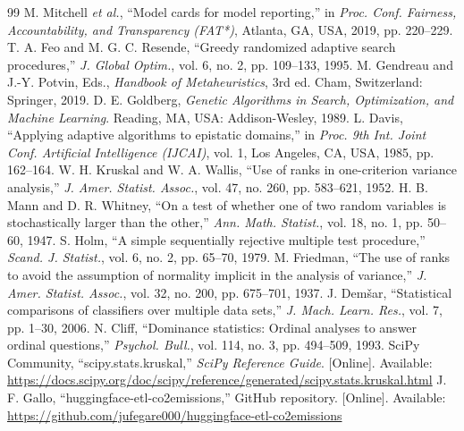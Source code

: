 \documentclass[conference]{IEEEtran}
\begin{document}
	\begin{thebibliography}{99}
		 M. Mitchell \emph{et al.}, ``Model cards for model reporting,'' in \emph{Proc. Conf. Fairness, Accountability, and Transparency (FAT*)}, Atlanta, GA, USA, 2019, pp. 220--229.
		 T. A. Feo and M. G. C. Resende, ``Greedy randomized adaptive search procedures,'' \emph{J. Global Optim.}, vol. 6, no. 2, pp. 109--133, 1995.
		 M. Gendreau and J.-Y. Potvin, Eds., \emph{Handbook of Metaheuristics}, 3rd ed. Cham, Switzerland: Springer, 2019.
		 D. E. Goldberg, \emph{Genetic Algorithms in Search, Optimization, and Machine Learning}. Reading, MA, USA: Addison-Wesley, 1989.
		 L. Davis, ``Applying adaptive algorithms to epistatic domains,'' in \emph{Proc. 9th Int. Joint Conf. Artificial Intelligence (IJCAI)}, vol. 1, Los Angeles, CA, USA, 1985, pp. 162--164.
		 W. H. Kruskal and W. A. Wallis, ``Use of ranks in one-criterion variance analysis,'' \emph{J. Amer. Statist. Assoc.}, vol. 47, no. 260, pp. 583--621, 1952.
		 H. B. Mann and D. R. Whitney, ``On a test of whether one of two random variables is stochastically larger than the other,'' \emph{Ann. Math. Statist.}, vol. 18, no. 1, pp. 50--60, 1947.
		 S. Holm, ``A simple sequentially rejective multiple test procedure,'' \emph{Scand. J. Statist.}, vol. 6, no. 2, pp. 65--70, 1979.
		 M. Friedman, ``The use of ranks to avoid the assumption of normality implicit in the analysis of variance,'' \emph{J. Amer. Statist. Assoc.}, vol. 32, no. 200, pp. 675--701, 1937.
		 J. Dem\v{s}ar, ``Statistical comparisons of classifiers over multiple data sets,'' \emph{J. Mach. Learn. Res.}, vol. 7, pp. 1--30, 2006.
		 N. Cliff, ``Dominance statistics: Ordinal analyses to answer ordinal questions,'' \emph{Psychol. Bull.}, vol. 114, no. 3, pp. 494--509, 1993.
		 SciPy Community, ``scipy.stats.kruskal,'' \emph{SciPy Reference Guide}. [Online]. Available: \url{https://docs.scipy.org/doc/scipy/reference/generated/scipy.stats.kruskal.html}
		 J. F. Gallo, ``huggingface-etl-co2emissions,'' GitHub repository. [Online]. Available: \url{https://github.com/jufegare000/huggingface-etl-co2emissions}
	\end{thebibliography}
	
\end{document}
